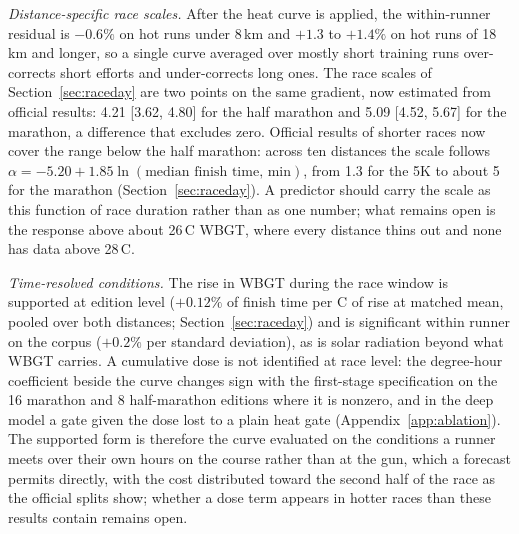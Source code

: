\documentclass[11pt]{article}
\renewcommand{\_}{\textunderscore\allowbreak}
\begin{document}
\emph{Distance-specific race scales.} After the heat curve is applied, the within-runner residual is $-0.6\%$ on hot runs under 8\,km and $+1.3$ to $+1.4\%$ on hot runs of 18\,km and longer, so a single curve averaged over mostly short training runs over-corrects short efforts and under-corrects long ones. The race scales of Section~\ref{sec:raceday} are two points on the same gradient, now estimated from official results: 4.21 [3.62, 4.80] for the half marathon and 5.09 [4.52, 5.67] for the marathon, a difference that excludes zero. Official results of shorter races now cover the range below the half marathon: across ten distances the scale follows $\alpha = -5.20 + 1.85\ln(\text{median finish time, min})$, from 1.3 for the 5K to about 5 for the marathon (Section~\ref{sec:raceday}). A predictor should carry the scale as this function of race duration rather than as one number; what remains open is the response above about 26\,\textdegree C WBGT, where every distance thins out and none has data above 28\,\textdegree C.

\emph{Time-resolved conditions.} The rise in WBGT during the race window is supported at edition level ($+0.12\%$ of finish time per \textdegree C of rise at matched mean, pooled over both distances; Section~\ref{sec:raceday}) and is significant within runner on the corpus ($+0.2\%$ per standard deviation), as is solar radiation beyond what WBGT carries. A cumulative dose is not identified at race level: the degree-hour coefficient beside the curve changes sign with the first-stage specification on the 16 marathon and 8 half-marathon editions where it is nonzero, and in the deep model a gate given the dose lost to a plain heat gate (Appendix~\ref{app:ablation}). The supported form is therefore the curve evaluated on the conditions a runner meets over their own hours on the course rather than at the gun, which a forecast permits directly, with the cost distributed toward the second half of the race as the official splits show; whether a dose term appears in hotter races than these results contain remains open.
\end{document}
